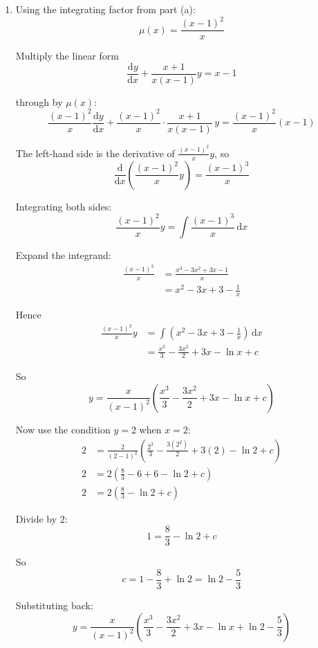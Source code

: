 \documentclass[leqno]{article}
\begin{document}
\begin{enumerate}[
  label=\textbf{\arabic*.},
  leftmargin=*,
  topsep=0pt,
  partopsep=0pt,
  parsep=0pt
]
\begin{djsSolution}
\begin{enumerate}[label=\textbf{(\alph*)}]
Since $x>1$, we have $x>0$ and $x-1>0$, so an appropriate integrating factor is
\[
\mu(x)=\frac{(x-1)^2}{x}
\]

  \item Using the integrating factor from part (a):
\[
\mu(x)=\frac{(x-1)^2}{x}
\]

Multiply the linear form
\[
\frac{\mathrm{d}y}{\mathrm{d}x}+\frac{x+1}{x(x-1)}y=x-1
\]

through by $\mu(x)$:
\[
\frac{(x-1)^2}{x}\frac{\mathrm{d}y}{\mathrm{d}x}+\frac{(x-1)^2}{x}\cdot\frac{x+1}{x(x-1)}\,y=\frac{(x-1)^2}{x}(x-1)
\]

The left-hand side is the derivative of $\frac{(x-1)^2}{x}y$, so
\[
\frac{\mathrm{d}}{\mathrm{d}x}\left(\frac{(x-1)^2}{x}y\right)=\frac{(x-1)^3}{x}
\]

Integrating both sides:
\[
\frac{(x-1)^2}{x}y=\int \frac{(x-1)^3}{x}\,\mathrm{d}x
\]

Expand the integrand:
\begin{align*}
\frac{(x-1)^3}{x}&=\frac{x^3-3x^2+3x-1}{x} \\
&=x^2-3x+3-\frac{1}{x}
\end{align*}

Hence
\begin{align*}
\frac{(x-1)^2}{x}y&=\int \left(x^2-3x+3-\frac{1}{x}\right)\,\mathrm{d}x \\
&=\frac{x^3}{3}-\frac{3x^2}{2}+3x-\ln x+c
\end{align*}

So
\[
y=\frac{x}{(x-1)^2}\left(\frac{x^3}{3}-\frac{3x^2}{2}+3x-\ln x+c\right)
\]

Now use the condition $y=2$ when $x=2$:
\begin{align*}
2&=\frac{2}{(2-1)^2}\left(\frac{2^3}{3}-\frac{3(2^2)}{2}+3(2)-\ln 2+c\right) \\
2&=2\left(\frac{8}{3}-6+6-\ln 2+c\right) \\
2&=2\left(\frac{8}{3}-\ln 2+c\right)
\end{align*}

Divide by $2$:
\[
1=\frac{8}{3}-\ln 2+c
\]

So
\[
c=1-\frac{8}{3}+\ln 2=\ln 2-\frac{5}{3}
\]

Substituting back:
\[
y=\frac{x}{(x-1)^2}\left(\frac{x^3}{3}-\frac{3x^2}{2}+3x-\ln x+\ln 2-\frac{5}{3}\right)
\]
\end{enumerate}
\end{djsSolution}


\newpage

\questionitem


\end{enumerate}
\end{document}
